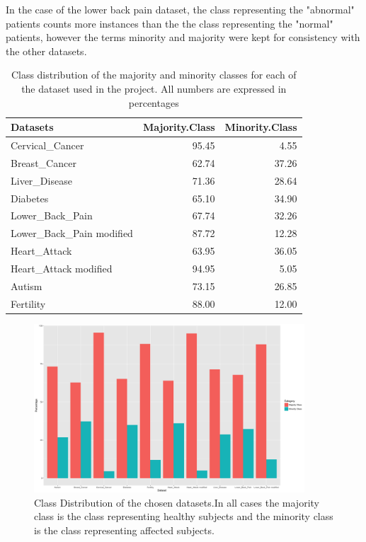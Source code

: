 In the case of the lower back pain dataset, the class representing the "abnormal" patients counts more instances than the the class representing the "normal" patients, however the terms minority and majority were kept for consistency with the other datasets.\newline



\begin{table}[!htbp]
\centering
\begin{tabular}{lrr}
  \hline
  \rowcolor{LightCyan}
Datasets & Majority.Class & Minority.Class \\ 
  \hline
Cervical\_Cancer & 95.45 & 4.55 \\ 
  Breast\_Cancer & 62.74 & 37.26 \\ 
  Liver\_Disease & 71.36 & 28.64 \\ 
  Diabetes & 65.10 & 34.90 \\ 
  Lower\_Back\_Pain & 67.74 & 32.26 \\ 
  Lower\_Back\_Pain modified & 87.72 & 12.28 \\ 
  Heart\_Attack & 63.95 & 36.05 \\ 
  Heart\_Attack modified & 94.95 & 5.05 \\ 
  Autism & 73.15 & 26.85 \\ 
  Fertility & 88.00 & 12.00 \\ 
   \hline
\end{tabular}
\caption{Class distribution of the majority and minority classes for each of the dataset used in the project. All numbers are expressed in percentages}
\end{table}

\begin{figure}[!htbp]
    \centering
    \includegraphics[width=0.9\textwidth]{ThesisTemplate/usingLatex/chapter4Images/figure4_1b.png}
    \caption{Class Distribution of the chosen datasets.\newline In all cases the majority class is the class representing healthy subjects and the minority class is the class representing affected subjects.}
    \label{fig:my_label}
\end{figure}





